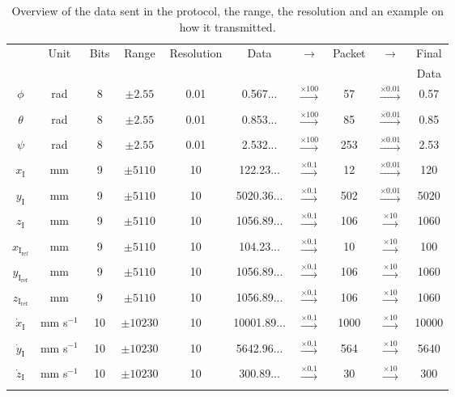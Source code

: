 \begin{table}[H]
    \centering
    \begin{tabular}{|c|c|c|c|c|ccccc|}
        \hline
        \multirow{2}{*}{}      &  \multirow{2}{*}{Unit}       &  \multirow{2}{*}{Bits}     & \multirow{2}{*}{Range} 	   & \multirow{2}{*}{Resolution} 	  & \multirow{2}{*}{Data}& \multirow{2}{*}{$\rightarrow$}& \multirow{2}{*}{Packet}& \multirow{2}{*}{$\rightarrow$}& Final\\
          & & & & & & & & & Data	 \\ \hline
        $\phi$         & rad	 &	8    & $\pm 2.55$ & 0.01 & 0.567... &$\xrightarrow[]{\times 100}$& 57&$\xrightarrow[]{\times 0.01}$&0.57\\ \hline
        $\theta$       & rad	&	8    & $\pm 2.55$ & 0.01 & 0.853... &$\xrightarrow[]{\times 100}$& 85&$\xrightarrow[]{\times 0.01}$&0.85\\ \hline
        $\psi$         & rad	&	8    & $\pm 2.55$ & 0.01 & 2.532... &$\xrightarrow[]{\times 100}$& 253&$\xrightarrow[]{\times 0.01}$&2.53\\ \hline
        $x_{\mathrm{I}}$         & mm	&  9  & $\pm 5110$ & 10  & 122.23...& $\xrightarrow[]{\times 0.1}$& 12&$\xrightarrow[]{\times 0.01}$&120\\ \hline
        $y_{\mathrm{I}}$         & mm	&9	    & $\pm 5110$ & 10 & 5020.36...& $\xrightarrow[]{\times 0.1}$& 502&$\xrightarrow[]{\times 0.01}$&5020\\ \hline
        $z_{\mathrm{I}}$         & mm	&   9     & $\pm 5110$ & 10 & 1056.89...&$\xrightarrow[]{\times 0.1}$& 106&$\xrightarrow[]{\times 10}$&1060\\ \hline
        $x_{\mathrm{I_{ref}}}$     & mm	&9	    & $\pm 5110$ & 10 & 104.23... &$\xrightarrow[]{\times 0.1}$& 10&$\xrightarrow[]{\times 10}$&100\\ \hline
        $y_{\mathrm{I_{ref}}}$     & mm	& 9   & $\pm 5110$ & 10 &  1056.89... &$\xrightarrow[]{\times 0.1}$& 106&$\xrightarrow[]{\times 10}$&1060\\ \hline
        $z_{\mathrm{I_{ref}}}$     & mm 	&9	    & $\pm 5110$ & 10 & 1056.89... &$\xrightarrow[]{\times 0.1}$& 106&$\xrightarrow[]{\times 10}$&1060\\ \hline
        $\dot{x}_{\mathrm{I}}$  & mm s$^{-1}$		 &  10 & $\pm 10230$ & 10 & 10001.89...& $\xrightarrow[]{\times 0.1}$& 1000&$\xrightarrow[]{\times 10}$&10000\\ \hline
        $\dot{y}_{\mathrm{I}}$  & 	mm s$^{-1}$	&  10  & $\pm 10230$ & 10 & 5642.96... &$\xrightarrow[]{\times 0.1}$& 564&$\xrightarrow[]{\times 10}$&5640\\ \hline
        $\dot{z}_{\mathrm{I}}$  & 	mm s$^{-1}$	&  10  & $\pm 10230$ & 10 & 300.89... &$\xrightarrow[]{\times 0.1}$& 30&$\xrightarrow[]{\times 10}$&300\\ \hline        
    \end{tabular}
    \caption{Overview of the data sent in the protocol, the range, the resolution and an example on how it transmitted.}
    \label{tab:data}
\end{table}
